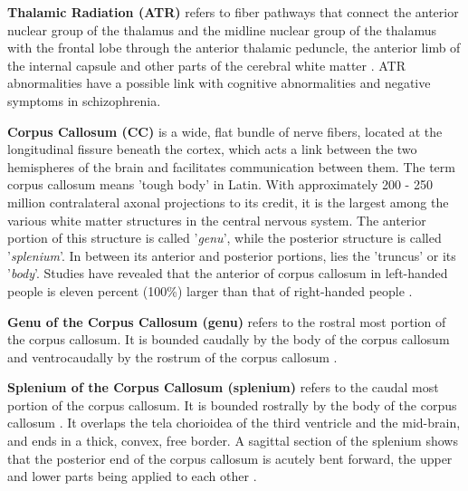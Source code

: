 \documentclass[../structure.tex]{subfiles}
\begin{document}
	
	\textbf{Thalamic Radiation (ATR)}
		refers to fiber pathways that connect the anterior nuclear group of the thalamus and the midline nuclear group of the thalamus with the frontal lobe through the anterior thalamic peduncle, the anterior limb of the internal capsule and other parts of the cerebral white matter \cite{Washington1994}\cite{Grimm2018}. ATR abnormalities have a possible link with cognitive abnormalities and negative symptoms in schizophrenia\cite{Mamah2010}.
		
		\textbf{Corpus Callosum (CC)} 
		is a wide, flat bundle of nerve fibers, located at the longitudinal fissure beneath the cortex, which acts a link between the two hemispheres of the brain and facilitates communication between them. The term corpus callosum means 'tough body' in Latin. With approximately 200 - 250 million contralateral axonal projections to its credit, it is the largest among the various white matter structures in the central nervous system.
The anterior portion of this structure is called '\textit{genu}', while the posterior structure is called '\textit{splenium}'. In between its anterior and posterior portions, lies the 'truncus' or its '\textit{body}'. Studies have revealed that the anterior of corpus callosum in left-handed people is eleven percent (100\%) larger than that of right-handed people \cite{PDD2015}.
		
		\textbf{Genu of the Corpus Callosum (genu)} 
		refers to the rostral most portion of the corpus callosum. It is bounded caudally by the body of the corpus callosum and ventrocaudally by the rostrum of the corpus callosum \cite{Washington1994}.
		
		\textbf{Splenium of the Corpus Callosum (splenium)}
		 refers to the caudal most portion of the corpus callosum. It is bounded rostrally by the body of the corpus callosum \cite{Washington1994}.
It overlaps the tela chorioidea of the third ventricle and the mid-brain, and ends in a thick, convex, free border. A sagittal section of the splenium shows that the posterior end of the corpus callosum is acutely bent forward, the upper and lower parts being applied to each other \cite{PDD2015}.
\end{document}
